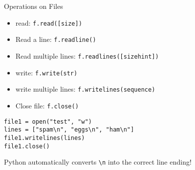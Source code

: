 \begin{frame}[fragile]{Operations on Files}
\begin{itemize}
\item \alert{read}: \lstinline{f.read([size])}
\item Read a line: \lstinline{f.readline()}
\item Read multiple lines: \lstinline{f.readlines([sizehint])}
\item \alert{write}: \lstinline{f.write(str)}
\item write multiple lines: \lstinline{f.writelines(sequence)}
\item \alert{Close} file: \lstinline{f.close()}
\end{itemize}
\begin{lstlisting}[style=Python]
file1 = open("test", "w")
lines = ["spam\n", "eggs\n", "ham\n"]
file1.writelines(lines)
file1.close()
\end{lstlisting}
Python automatically converts \lstinline{\n} into the correct line ending!
\end{frame}
